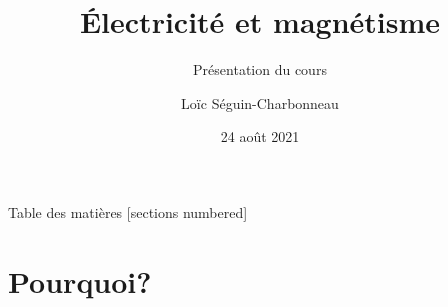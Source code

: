 \documentclass[12pt]{beamer}
\title{Électricité et magnétisme}
\subtitle{Présentation du cours}
\date{24 août 2021}
\author{Loïc Séguin-Charbonneau}
\institute{Cégep Édouard-Montpetit}
\makeatletter
\renewcommand\footnotesize{%
   \@setfontsize\footnotesize\@viipt{11}%
   \abovedisplayskip 8\p@ \@plus2\p@ \@minus4\p@
   \abovedisplayshortskip \z@ \@plus\p@
   \belowdisplayshortskip 4\p@ \@plus2\p@ \@minus2\p@
   \def\@listi{\leftmargin\leftmargini
               \topsep 4\p@ \@plus2\p@ \@minus2\p@
               \parsep 2\p@ \@plus\p@ \@minus\p@
               \itemsep \parsep}%
   \belowdisplayskip \abovedisplayskip
}
\makeatother
\begin{document}

\maketitle


\begin{frame}{Table des matières}
  [sections numbered]
  \tableofcontents[hideallsubsections]
\end{frame}


\section{Pourquoi?}




%
%
\end{document}
